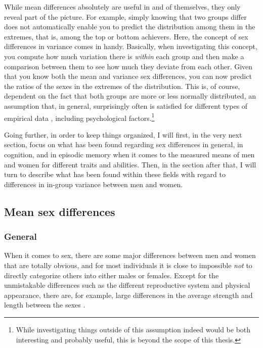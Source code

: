 While mean differences absolutely are useful in and of themselves, they only reveal part of the picture. For example, simply knowing that two groups differ does not automatically enable you to predict the distribution among them in the extremes, that is, among the top or bottom achievers. Here, the concept of sex differences in variance comes in handy. Basically, when investigating this concept, you compute how much variation there is \emph{within} each group and then make a comparison between them to see how much they deviate from each other. Given that you know both the mean and variance sex differences, you can now predict the ratios of the sexes in the extremes of the distribution. This is, of course, dependent on the fact that both groups are more or less normally distributed, an assumption that, in general, surprisingly often is satisfied for different types of empirical data \parencite{Frank2009}, including psychological factors.\footnote{While investigating things outside of this assumption indeed would be both interesting and probably useful, this is beyond the scope of this thesis.}

Going further, in order to keep things organized, I will first, in the very next section, focus on what has been found regarding sex differences in general, in cognition, and in episodic memory when it comes to the measured means of men and women for different traits and abilities. Then, in the section after that, I will turn to describe what has been found within these fields with regard to differences in in-group variance between men and women.

\subsection{Mean sex differences} \label{Mean_differences}

\subsubsection{General} \label{Mean_differences_General}

When it comes to sex, there are some major differences between men and women that are totally obvious, and for most individuals it is close to impossible \emph{not} to directly categorize others into either males or females. Except for the unmistakable differences such as the different reproductive system and physical appearance, there are, for example, large differences in the average strength and length between the sexes \parencite{Fryar2016}.

